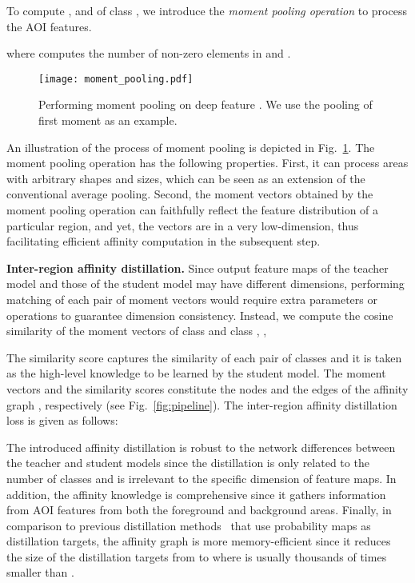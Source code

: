 \documentclass[10pt,twocolumn,letterpaper]{article}
\begin{document}
To compute ,  and  of class , we introduce the \textit{moment pooling operation} to process the AOI features. 

where  computes the number of non-zero elements in  and . 

\begin{figure}[t]
  \centering
  \texttt{[image: moment\_pooling.pdf]}
  \caption{Performing moment pooling on deep feature . We use the pooling of first moment as an example.}
  \centering
  \vskip -0.4cm
  \label{fig:moment_pooling}
\end{figure}

An illustration of the process of moment pooling is depicted in Fig.~\ref{fig:moment_pooling}.
The moment pooling operation has the following properties. First, it can process areas with arbitrary shapes and sizes, which can be seen as an extension of the conventional average pooling. Second, the moment vectors obtained by the moment pooling operation can faithfully reflect the feature distribution of a particular region, and yet, the vectors are in a very low-dimension, thus facilitating efficient affinity computation in the subsequent step. 



\vspace{0.1cm}
\noindent \textbf{Inter-region affinity distillation.}
Since output feature maps of the teacher model and those of the student model may have different dimensions, performing matching of each pair of moment vectors would require extra parameters or operations to guarantee dimension consistency. Instead, we compute the cosine similarity of the moment vectors of class  and class , \ie, 


The similarity score captures the similarity of each pair of classes and it is taken as the high-level knowledge to be learned by the student model. The moment vectors  and the similarity scores  constitute the nodes and the edges of the affinity graph , respectively (see Fig.~\ref{fig:pipeline}). 
The inter-region affinity distillation loss is given as follows:



The introduced affinity distillation is robust to the network differences between the teacher and student models since the distillation is only related to the number of classes and is irrelevant to the specific dimension of feature maps. In addition, the affinity knowledge is comprehensive since it gathers information from AOI features from both the foreground and background areas. Finally, in comparison to previous distillation methods~\cite{hinton2015distilling} that use probability maps as distillation targets, the affinity graph is more memory-efficient since it reduces the size of the distillation targets from  to  where  is usually thousands of times smaller than .
\end{document}
